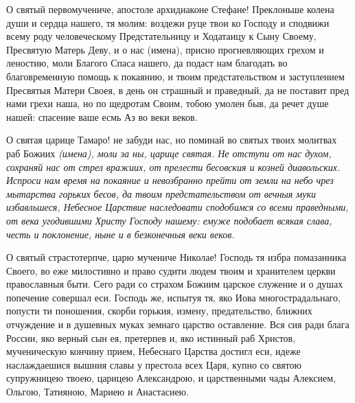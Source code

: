  
{\noparindent\begin{center}\begin{minipage}{0.7\textwidth}
\restoreparindent{}О святый первомучениче, апостоле архидиаконе Стефане! Преклоньше колена души и сердца нашего, тя молим: воздежи руце твои ко Господу и сподвижи всему роду человеческому Предстательницу и Ходатаицу к Сыну Своему, Пресвятую Матерь Деву, и о нас (имена), присно прогневляющих грехом и леностию, моли Благого Спаса нашего, да подаст нам благодать во благовременную помощь к покаянию, и твоим предстательством и заступлением Пресвятыя Матери Своея, в день он страшный и праведный, да не поставит пред нами грехи наша, но по щедротам Своим, тобою умолен быв, да речет душе нашей: спасение ваше есмь Аз во веки веков.
\end{minipage}\end{center}}\mychapterending

 
О святая царице Тамаро! не забуди нас, но поминай во святых твоих молитвах раб Божиих \itshape (имена)\normalfont{}, моли за ны, царице святая. Не отступи от нас духом, сохраняй нас от стрел вражиих, от прелести бесовския и козней диавольских. Испроси нам время на покаяние и невозбранно прейти от земли на небо чрез мытарства горьких бесов, да твоим предстательством от вечныя муки избавльшеся, Небесное Царствие наследовати сподобимся со всеми праведными, от века угодившими Христу Господу нашему: емуже подобает всякая слава, честь и поклонение, ныне и в безконечныя веки веков.
\mychapterending

 



О святый страстотерпче, царю мучениче Николае! Господь тя избра помазанника Своего, во еже милостивно и право судити людем твоим и хранителем церкви православныя быти. Сего ради со страхом Божиим царское служение и о душах попечение совершал еси. Господь же, испытуя тя, яко Иова многострадальнаго, попусти ти поношения, скорби горькия, измену, предательство, ближних отчуждение и в душевных муках земнаго царство оставление. Вся сия ради блага России, яко верный сын ея, претерпев и, яко истинный раб Христов, мученическую кончину прием, Небеснаго Царства достигл еси, идеже наслаждаешися вышния славы у престола всех Царя, купно со святою супружницею твоею, царицею Александрою, и царственными чады Алексием, Ольгою, Татияною, Мариею и Анастасиею. 


